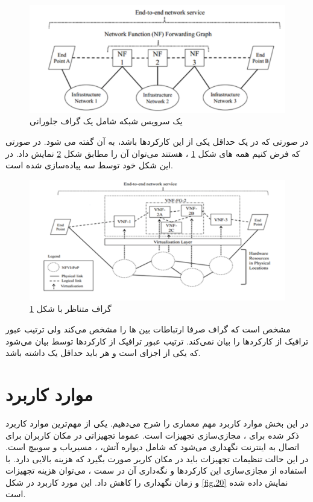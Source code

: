 \begin{figure}[h!]
\center\includegraphics[scale=.5]{images/network-service}
\caption{یک سرویس شبکه شامل یک گراف جلورانی}
\label{fig.18}
\end{figure}

در صورتی که در یک   حداقل یکی از این کارکردها  باشد، به آن  گفته می شود.
در صورتی که فرض کنیم همه  های شکل
\ref{fig.18}
،  هستند می‌توان آن را مطابق شکل
\ref{fig.19}
نمایش داد.
در این شکل  خود توسط سه  پیاده‌سازی شده است.

\begin{figure}[h!]
\center\includegraphics[scale=.5]{images/vnf-fg}
\caption{گراف  متناظر با شکل \ref{fig.18}}
\label{fig.19}
\end{figure}

مشخص است که گراف  صرفا ارتباطات بین ‌ها را مشخص می‌کند ولی ترتیب عبور ترافیک از کارکردها را بیان نمی‌کند.
ترتیب عبور ترافیک از کارکردها توسط  بیان می‌شود که یکی از اجزای  است و هر  باید حداقل یک  داشته باشد.

\section{موارد کاربرد}
در این بخش موارد کاربرد مهم معماری  را شرح می‌دهیم.
یکی از مهم‌ترین موارد کاربرد ذکر شده برای ،  مجازی‌سازی تجهیزات  است.
عموما تجهیزاتی در مکان کاربران برای اتصال به اینترنت نگهداری می‌شود که شامل دیواره آتش، ، مسیریاب و سوییچ است.
در این حالت تنظیمات تجهیزات باید در مکان کاربر صورت بگیرد که هزینه بالایی دارد.
با استفاده از مجازی‌سازی این کارکردها و نگه‌داری آن در سمت ، می‌توان هزینه تجهیزات و زمان نگهداری را کاهش داد.
این مورد کاربرد در شکل \ref{fig.20} نمایش داده شده است.

